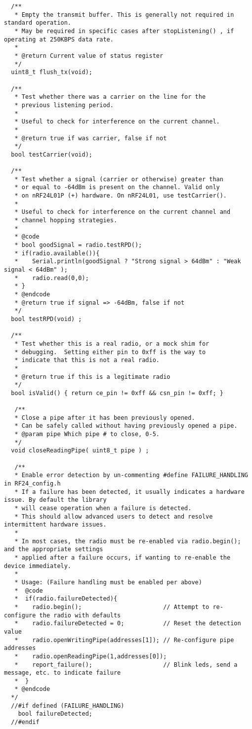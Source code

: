 \documentclass{article}
\begin{document}
\begin{itemize}
\begin{enumerate}
\begin{enumerate}
\begin{lstlisting}
  /**
   * Empty the transmit buffer. This is generally not required in standard operation.
   * May be required in specific cases after stopListening() , if operating at 250KBPS data rate.
   *
   * @return Current value of status register
   */
  uint8_t flush_tx(void);

  /**
   * Test whether there was a carrier on the line for the
   * previous listening period.
   *
   * Useful to check for interference on the current channel.
   *
   * @return true if was carrier, false if not
   */
  bool testCarrier(void);

  /**
   * Test whether a signal (carrier or otherwise) greater than
   * or equal to -64dBm is present on the channel. Valid only
   * on nRF24L01P (+) hardware. On nRF24L01, use testCarrier().
   *
   * Useful to check for interference on the current channel and
   * channel hopping strategies.
   *
   * @code
   * bool goodSignal = radio.testRPD();
   * if(radio.available()){
   *    Serial.println(goodSignal ? "Strong signal > 64dBm" : "Weak signal < 64dBm" );
   *    radio.read(0,0);
   * }
   * @endcode
   * @return true if signal => -64dBm, false if not
   */
  bool testRPD(void) ;

  /**
   * Test whether this is a real radio, or a mock shim for
   * debugging.  Setting either pin to 0xff is the way to
   * indicate that this is not a real radio.
   *
   * @return true if this is a legitimate radio
   */
  bool isValid() { return ce_pin != 0xff && csn_pin != 0xff; }
  
   /**
   * Close a pipe after it has been previously opened.
   * Can be safely called without having previously opened a pipe.
   * @param pipe Which pipe # to close, 0-5.
   */
  void closeReadingPipe( uint8_t pipe ) ;

   /**
   * Enable error detection by un-commenting #define FAILURE_HANDLING in RF24_config.h
   * If a failure has been detected, it usually indicates a hardware issue. By default the library
   * will cease operation when a failure is detected.  
   * This should allow advanced users to detect and resolve intermittent hardware issues.  
   *   
   * In most cases, the radio must be re-enabled via radio.begin(); and the appropriate settings
   * applied after a failure occurs, if wanting to re-enable the device immediately.
   * 
   * Usage: (Failure handling must be enabled per above)
   *  @code
   *  if(radio.failureDetected){ 
   *    radio.begin();                       // Attempt to re-configure the radio with defaults
   *    radio.failureDetected = 0;           // Reset the detection value
   *	radio.openWritingPipe(addresses[1]); // Re-configure pipe addresses
   *    radio.openReadingPipe(1,addresses[0]);
   *    report_failure();                    // Blink leds, send a message, etc. to indicate failure
   *  }
   * @endcode
  */
  //#if defined (FAILURE_HANDLING)
    bool failureDetected; 
  //#endif
    

\end{lstlisting}
\end{enumerate}
\end{enumerate}
\end{itemize}
\end{document}
